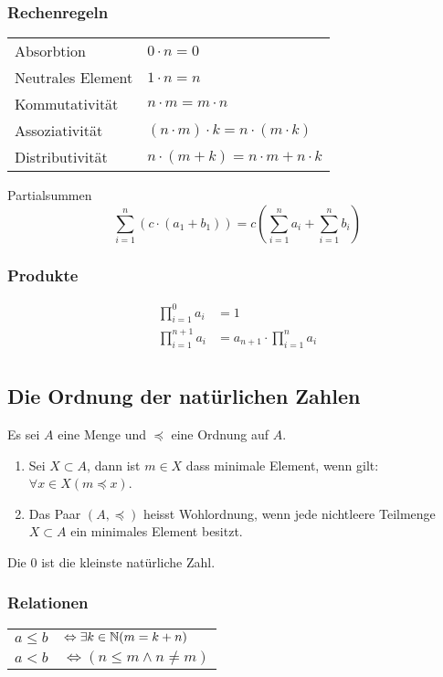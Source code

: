 \subsubsection{Rechenregeln}
\settowidth{\MyLenA}{Neutrales Element~~}
\begin{tabular}{@{}p{\the\MyLenA}%
				@{}p{}}
	Absorbtion				& $0 \cdot n = 0$\\
	Neutrales Element 		& $1 \cdot n = n$\\
	Kommutativität			& $n \cdot m = m \cdot n$\\
	Assoziativität			& $(n \cdot m) \cdot k = n \cdot (m \cdot k)$\\
	Distributivität			& $n \cdot (m + k) = n \cdot m + n \cdot k$\\
\end{tabular}
Partialsummen
\begin{equation*}
	\sum_{i=1}^n (c \cdot(a_1 + b_1)) = c \left (\sum_{i=1}^n a_i + \sum_{i=1}^n b_i \right )
\end{equation*}

\subsubsection{Produkte}
\begin{align*}
	\prod_{i=1}^0 a_i& = 1\\
	\prod_{i=1}^{n + 1} a_i& = a_{n+1} \cdot \prod_{i=1}^n a_i\\
\end{align*}

\subsection{Die Ordnung der natürlichen Zahlen}
Es sei $A$ eine Menge und $\preceq$ eine Ordnung auf $A$.
\begin{enumerate}
	\item Sei $X \subset A$, dann ist $m \in X$ dass minimale Element, wenn gilt: $\forall x \in X (m \preceq x)$.
	\item Das Paar $(A, \preceq)$ heisst Wohlordnung, wenn jede nichtleere Teilmenge $X \subset A$ ein minimales Element besitzt.
\end{enumerate}
Die 0 ist die kleinste natürliche Zahl.

\subsubsection{Relationen}
\settowidth{\MyLenA}{$a \leq b$ ~~}
\begin{tabular}{@{}p{\the\MyLenA}%
				@{}p{}}
	$a \leq b$				& $\Leftrightarrow \exists k \in \mathbb{N} (m = k + n)$\\
	$a < b$ 				& $\Leftrightarrow (n \leq m \wedge n \neq m)$\\
\end{tabular}

